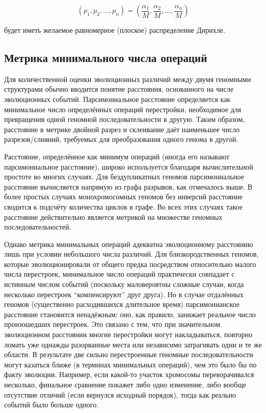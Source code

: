 \[
(p_1, p_2, \ldots, p_n) 
= \left(\frac{\alpha_1}{M}, \frac{\alpha_2}{M}, \dots, \frac{\alpha_n}{M}\right)
\]

будет иметь желаемое равномерное (плоское) распределение Дирихле.

\subsection{Метрика минимального числа операций}
\label{sec:minimal_operations}

Для количественной оценки эволюционных различий между двумя геномными структурами обычно вводится понятие расстояния, основанного на числе эволюционных событий.
Парсимониальное расстояние определяется как минимальное число определённых операций перестройки, необходимое для превращения одной геномной последовательности в другую.
Таким образом, расстояние в метрике двойной разрез и склеивание даёт наименьшее число разрезов/слияний, требуемых для преобразования одного генома в другой.

Расстояние, определённое как минимум операций (иногда его называют парсимониальное расстояние), широко используется благодаря вычислительной простоте во многих случаях.
Для бездупликатных геномов парсимониальное расстояние вычисляется напрямую из графа разрывов, как отмечалось выше.
В более простых случаях монохромосомных геномов без инверсий расстояние сводится к подсчёту количества циклов в графе.
Во всех этих случаях такое расстояние действительно является метрикой на множестве геномных последовательностей.

Однако метрика минимальных операций адекватна эволюционному расстоянию лишь при условии небольшого числа различий.
Для близкородственных геномов, которые эволюционировали от общего предка посредством относительно малого числа перестроек, минимальное число операций практически совпадает с истинным числом событий (поскольку маловероятны сложные случаи, когда несколько перестроек ``компенсируют'' друг друга).
Но в случае отдалённых геномов (существенно расходившихся длительное время) парсимонианское расстояние становится ненадёжным: оно, как правило, занижает реальное число произошедших перестроек.
Это связано с тем, что при значительном эволюционном расстоянии многие перестройки могут накладываться, повторно ломать уже однажды разорванные места или независимо затрагивать одни и те же области.
В результате две сильно перестроенные геномные последовательности могут казаться ближе (в терминах минимальных операций), чем это было бы по факту эволюции.
Например, если какой-то участок хромосомы переворачивался несколько, финальное сравнение покажет либо одно изменение, либо вообще отсутствие отличий (если вернулся исходный порядок), тогда как реально событий было больше одного.

